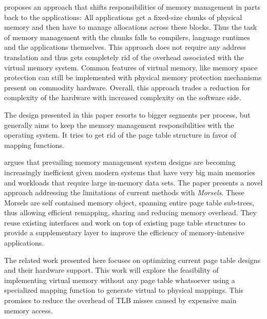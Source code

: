 
\cite{zagieboylo2020cost} proposes an approach that shifts responsibilities of memory management in
parts back to the applications: All applications get a fixed-size chunks of physical memory and then have to manage allocations across these blocks.
Thus the task of memory management with the chunks falls to compilers, language runtimes and the applications themselves.
This approach does not require any address translation and thus gets completely rid of the overhead associated with the virtual memory system.
Common features of virtual memory, like memory space protection can still be implemented with physical memory protection mechanisms present on commodity hardware.
Overall, this approach trades a reduction for complexity of the hardware with increased complexity on the software side.

The design presented in this paper resorts to bigger segments per process, but generally aims to keep the memory management responsibilities with the operating system. It tries to get rid of the page table structure in favor of mapping functions.


\cite{halbuer2023morsels} argues that prevailing memory management system designs are becoming increasingly inefficient given modern systems that have very big main memories and workloads that require large in-memory data sets.
The paper presents a novel approach addressing the limitations of current methods with \emph{Morsels}.
These Morsels are self contained memory object, spanning entire page table sub-trees, thus allowing efficient remapping, sharing and reducing memory overhead.
They reuse existing interfaces and work on top of existing page table structures to provide a supplementary layer to improve the efficiency of memory-intensive applications.


The related work presented here focuses on optimizing current page table designs and their hardware
support. This work will explore the feasibility of implementing virtual memory without any page table whatsoever using a specialized mapping function to generate virtual to physical mappings.
This promises to reduce the overhead of TLB misses caused by expensive main memory access.


